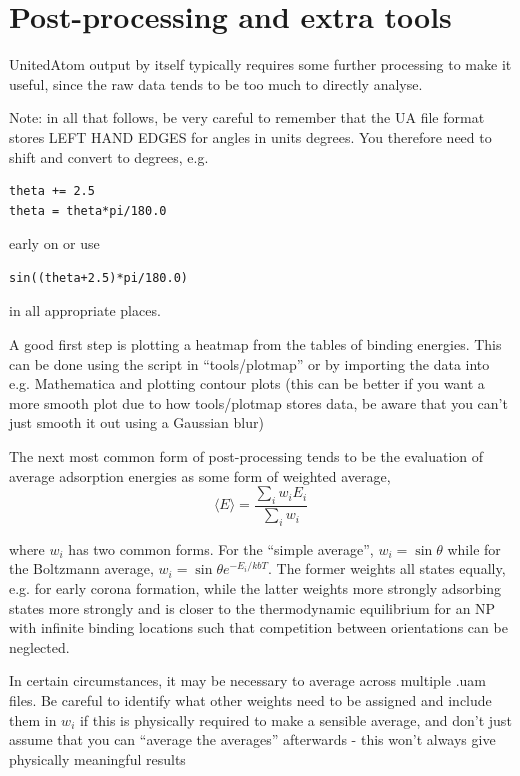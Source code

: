 \documentclass[10pt,a4paper,onecolumn]{report}
\begin{document}
\section{Post-processing and extra tools}
UnitedAtom output by itself typically requires some further processing to make it useful, since the raw data tends to be too much to directly analyse.

Note: in all that follows, be very careful to remember that the UA file format stores LEFT HAND EDGES for angles in units degrees. You therefore need to shift and convert to degrees, e.g.
\begin{lstlisting}
theta += 2.5
theta = theta*pi/180.0
\end{lstlisting}
early on or use
\begin{lstlisting}
sin((theta+2.5)*pi/180.0)
\end{lstlisting}
in all appropriate places.

A good first step is plotting a heatmap from the tables of binding energies. This can be done using the script in ``tools/plotmap'' or by importing the data into e.g. Mathematica and plotting contour plots (this can be better if you want a more smooth plot due to how tools/plotmap stores data, be aware that you can't just smooth it out using a Gaussian blur)

The next most common form of post-processing tends to be the evaluation of average adsorption energies as some form of weighted average,
\begin{equation}
\langle E \rangle = \frac{ \sum_i w_i E_i}{\sum_i w_i}
\end{equation}

where $w_i$ has two common forms. For the ``simple average'', $w_i = \sin \theta$ while for the Boltzmann average, $w_i = \sin \theta e^{-E_i/kbT}$. The former weights all states equally, e.g. for early corona formation, while the latter weights more strongly adsorbing states more strongly and is closer to the thermodynamic equilibrium for an NP with infinite binding locations such that competition between orientations can be neglected. 

In certain circumstances, it may be necessary to average across multiple .uam files. Be careful to identify what other weights need to be assigned and include them in $w_i$ if this is physically required to make a sensible average, and don't just assume that you can ``average the averages'' afterwards - this won't always give physically meaningful results
\end{document}
